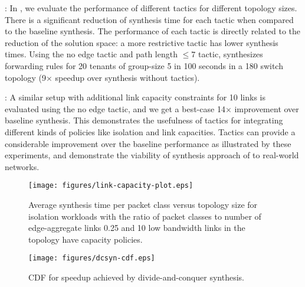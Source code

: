 : 
In ,
 we evaluate the performance of different tactics for different topology sizes. There is a
 significant reduction of synthesis time for each tactic when compared to the baseline synthesis.
 The performance of each tactic is directly related to the reduction of the solution space: a more
 restrictive tactic has lower synthesis times. 
  Using the no edge tactic
 and path length $\leq 7$ tactic, \Name synthesizes forwarding rules for 20 tenants of group-size 5 in 100 seconds in a 180 switch
 topology (9$\times$ speedup over synthesis without tactics).
  
 : A similar setup
 with additional link capacity constraints for 10 links is evaluated
 using the no edge tactic, and we get a best-case 14$\times$
 improvement over baseline synthesis. This demonstrates the usefulness
 of tactics for integrating different kinds of policies like isolation
 and link capacities.  Tactics can provide a considerable improvement
 over the baseline performance as illustrated by these experiments,
 and demonstrate the viability of synthesis approach of \Name to
 real-world networks.
 
\begin{figure}[h]
	\centering
	\texttt{[image: figures/link-capacity-plot.eps]}
	\caption{Average synthesis time per packet class versus topology size for isolation workloads 
		with the ratio of packet classes to number of edge-aggregate links 0.25 and 10 low bandwidth links in the topology 
		have capacity policies.}
	\label{fig:link-capacity}
\end{figure}

\begin{figure}
	\centering
	\texttt{[image: figures/dcsyn-cdf.eps]}
	\caption{CDF for speedup achieved by divide-and-conquer synthesis.}
	\label{fig:dcsyn-cdf}
\end{figure}
